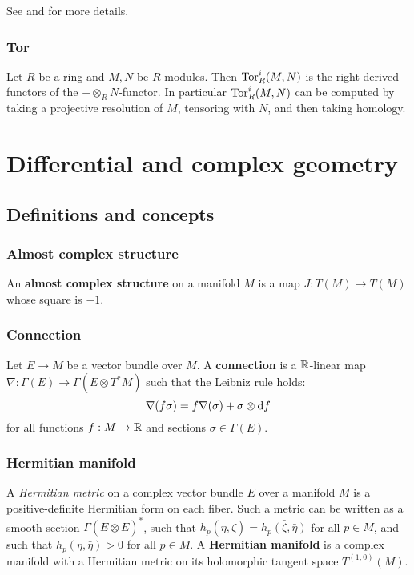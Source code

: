 \documentclass[11pt, english]{article}
\begin{document}
See \cite{eisenbud} and \cite{weibel} for more details. 

\subsubsection{Tor}
\label{tor}
Let $R$ be a ring and $M,N$ be $R$-modules. Then $\operatorname{\mathrm{Tor}}_R^i(M,N)$ is the right-derived functors of the $- \otimes_R N$-functor. In particular $\operatorname{\mathrm{Tor}}_R^i(M,N)$ can be computed by taking a projective resolution of $M$, tensoring with $N$, and then taking homology.

\section{Differential and complex geometry}
\subsection{Definitions and concepts}

\subsubsection{Almost complex structure}
\label{almostcomplex}

An \textbf{almost complex structure} on a manifold $M$ is a map $J:T(M) \to T(M)$ whose square is $-1$.

\subsubsection{Connection}
\label{connection}
Let $E \to M$ be a vector bundle over $M$. A \textbf{connection} is a $\mathbb{R}$-linear map $\nabla:\Gamma(E) \to \Gamma(E \otimes T^\ast M)$ such that the Leibniz rule holds:
\[
\nabla(f \sigma) = f \nabla(\sigma) + \sigma \otimes \mathrm{d}{f}
\]
for all functions $f:M \to \mathbb{R}$ and sections $\sigma \in \Gamma(E)$.

\subsubsection{Hermitian manifold}
\label{hermitianmanifold}

A \emph{Hermitian metric} on a complex vector bundle $E$ over a manifold $M$ is a positive-definite Hermitian form on each fiber. Such a metric can be written as a smooth section $\Gamma(E \otimes \bar{E})^\ast$, such that $h_p(\eta, \bar{\zeta}) = \bar{h_p\left(\zeta,\bar{\eta}\right)}$ for all $p \in M$, and such that $h_p(\eta,\bar{\eta}) > 0$ for all $p \in M$. A \textbf{Hermitian manifold} is a complex manifold with a Hermitian metric on its holomorphic tangent space $T^{(1,0)}(M)$.
\end{document}
